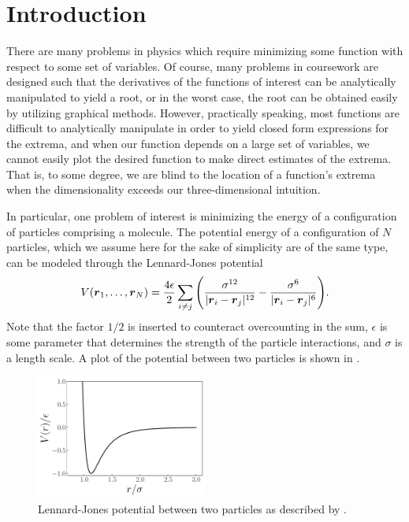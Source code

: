 
\def\HWnum{Project 1}
\def\duedate{September 25, 2024}




\section{Introduction}

There are many problems in physics which require minimizing some function with respect to some set of variables.
Of course, many problems in coursework are designed such that the derivatives of the functions of interest can be analytically manipulated to yield a root, or in the worst case, the root can be obtained easily by utilizing graphical methods.
However, practically speaking, most functions are difficult to analytically manipulate in order to yield closed form expressions for the extrema, and when our function depends on a large set of variables, we cannot easily plot the desired function to make direct estimates of the extrema.
That is, to some degree, we are blind to the location of a function's extrema when the dimensionality exceeds our three-dimensional intuition.

In particular, one problem of interest is minimizing the energy of a configuration of particles comprising a molecule.
The potential energy of a configuration of $N$ particles, which we assume here for the sake of simplicity are of the same type, can be modeled through the Lennard-Jones potential
\begin{align}
\label{eq:LJ-N-particle-potential}
    V(\vb*{r}_{1},\ldots,\vb*{r}_{N}) = \frac{4 \epsilon}{2} \sum_{i \ne j} \Bigg( \frac{\sigma^{12}}{|\vb*{r}_{i} - \vb*{r}_{j}|^{12}} - \frac{\sigma^{6}}{|\vb*{r}_{i} - \vb*{r}_{j}|^{6}} \Bigg)
.\end{align}
Note that the factor $1/2$ is inserted to counteract overcounting in the sum, $\epsilon$ is some parameter that determines the strength of the particle interactions, and $\sigma$ is a length scale.
A plot of the potential between two particles is shown in .


\begin{figure}[h!tb]
    \centering
    \includegraphics[width=0.5\textwidth]{1d-LJ-potential.pdf}
    \caption{Lennard-Jones potential between two particles as described by .}
    \label{fig:1d-LJ-potential}
\end{figure}


